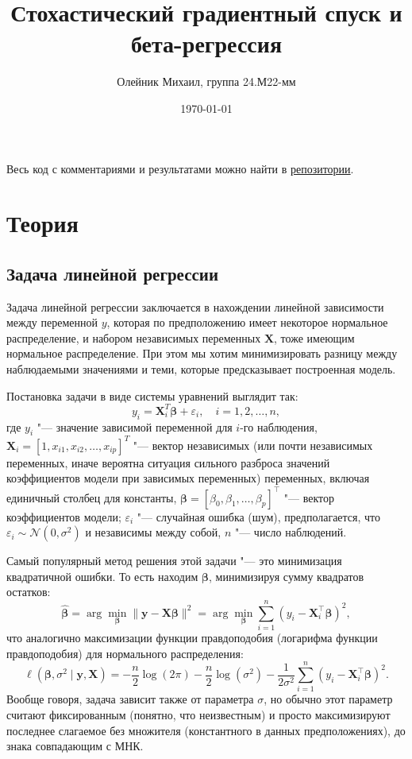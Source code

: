 \documentclass[12pt]{article}
\title{Стохастический градиентный спуск и бета-регрессия}
\author{Олейник Михаил, группа 24.М22-мм}
\date{\today}
\begin{document}
	\maketitle
	
	Весь код с комментариями и результатами можно найти в \href{https://github.com/UnicornRed/GradientDescentBeta}{репозитории}.
	
	\section{Теория}
	
	\subsection{Задача линейной регрессии}
	
	Задача линейной регрессии заключается в нахождении линейной зависимости между переменной $y$, которая по предположению имеет некоторое нормальное распределение, и набором независимых переменных $\mathbf{X}$, тоже имеющим нормальное распределение. При этом мы хотим минимизировать разницу между наблюдаемыми значениями и теми, которые предсказывает построенная модель.
	
	Постановка задачи в виде системы уравнений выглядит так:
	\[
	y_i = \mathbf{X}_i^T \boldsymbol{\beta} + \varepsilon_i, \quad i = 1, 2, \ldots, n,
	\]
	где $y_i$ "--- значение зависимой переменной для $i$-го наблюдения, $\mathbf{X}_i = [1, x_{i1}, x_{i2}, \ldots, x_{ip}]^T$ "--- вектор независимых (или почти независимых переменных, иначе вероятна ситуация сильного разброса значений коэффициентов модели при зависимых переменных) переменных, включая единичный столбец для константы, $ \boldsymbol{\beta} = [\beta_0, \beta_1, \ldots, \beta_p]^\top $ "--- вектор коэффициентов модели; $ \varepsilon_i $ "--- случайная ошибка (шум), предполагается, что $ \varepsilon_i \sim \mathcal{N}(0, \sigma^2) $ и независимы между собой, $ n $ "--- число наблюдений.
	
	Самый популярный метод решения этой задачи "--- это минимизация квадратичной ошибки. То есть находим $ \boldsymbol{\beta} $, минимизируя сумму квадратов остатков:
	\[
	\hat{\boldsymbol{\beta}} = \arg \min_{\boldsymbol{\beta}} \|\mathbf{y} - \mathbf{X} \boldsymbol{\beta}\|^2 = \arg \min_{\boldsymbol{\beta}} \sum_{i=1}^n (y_i - \mathbf{X}_i^\top \boldsymbol{\beta})^2,
	\]
	что аналогично максимизации функции правдоподобия (логарифма функции правдоподобия) для нормального распределения:
	\[
	\ell(\boldsymbol{\beta}, \sigma^2 \mid \mathbf{y}, \mathbf{X}) = -\frac{n}{2} \log(2 \pi) - \frac{n}{2} \log(\sigma^2) - \frac{1}{2 \sigma^2} \sum_{i=1}^n (y_i - \mathbf{X}_i^\top \boldsymbol{\beta})^2.
	\]
	Вообще говоря, задача зависит также от параметра $\sigma$, но обычно этот параметр считают фиксированным (понятно, что неизвестным) и просто максимизируют последнее слагаемое без множителя (константного в данных предположениях), до знака совпадающим с МНК.
	
\end{document}
